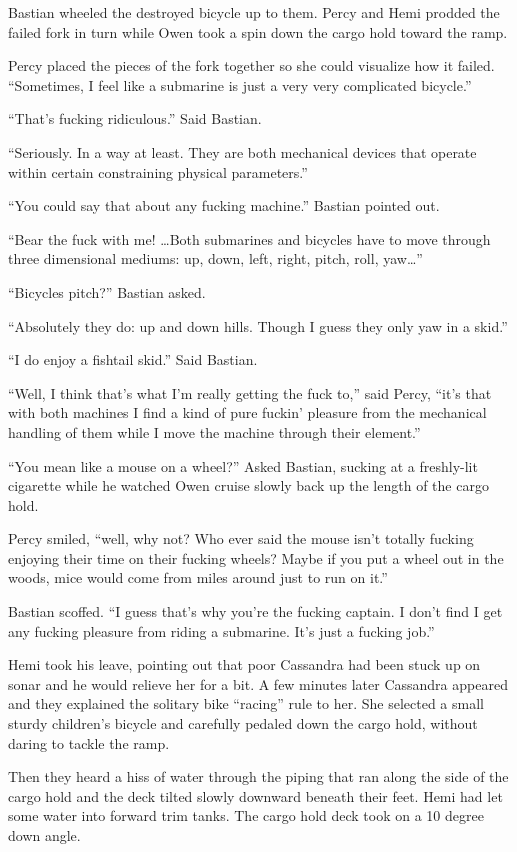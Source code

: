 \documentclass[
]{scrbook}
\begin{document}
Bastian wheeled the destroyed bicycle up to them. Percy and Hemi prodded
the failed fork in turn while Owen took a spin down the cargo hold
toward the ramp.

Percy placed the pieces of the fork together so she could visualize how
it failed. ``Sometimes, I feel like a submarine is just a very very
complicated bicycle.''

``That's fucking ridiculous.'' Said Bastian.

``Seriously. In a way at least. They are both mechanical devices that
operate within certain constraining physical parameters.''

``You could say that about any fucking machine.'' Bastian pointed out.

``Bear the fuck with me! \ldots Both submarines and bicycles have to
move through three dimensional mediums: up, down, left, right, pitch,
roll, yaw\ldots{}''

``Bicycles pitch?'' Bastian asked.

``Absolutely they do: up and down hills. Though I guess they only yaw in
a skid.''

``I do enjoy a fishtail skid.'' Said Bastian.

``Well, I think that's what I'm really getting the fuck to,'' said
Percy, ``it's that with both machines I find a kind of pure fuckin'
pleasure from the mechanical handling of them while I move the machine
through their element.''

``You mean like a mouse on a wheel?'' Asked Bastian, sucking at a
freshly-lit cigarette while he watched Owen cruise slowly back up the
length of the cargo hold.

Percy smiled, ``well, why not? Who ever said the mouse isn't totally
fucking enjoying their time on their fucking wheels? Maybe if you put a
wheel out in the woods, mice would come from miles around just to run on
it.''

Bastian scoffed. ``I guess that's why you're the fucking captain. I
don't find I get any fucking pleasure from riding a submarine. It's just
a fucking job.''

Hemi took his leave, pointing out that poor Cassandra had been stuck up
on sonar and he would relieve her for a bit. A few minutes later
Cassandra appeared and they explained the solitary bike ``racing'' rule
to her. She selected a small sturdy children's bicycle and carefully
pedaled down the cargo hold, without daring to tackle the ramp.

Then they heard a hiss of water through the piping that ran along the
side of the cargo hold and the deck tilted slowly downward beneath their
feet. Hemi had let some water into forward trim tanks. The cargo hold
deck took on a 10 degree down angle.
\end{document}
